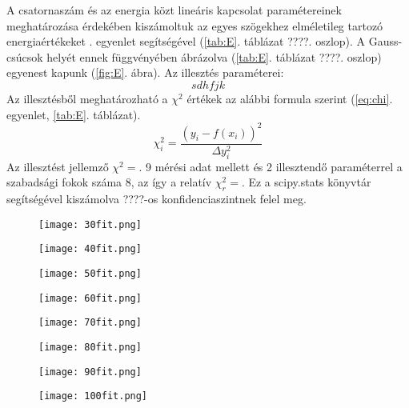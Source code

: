 \documentclass[a4paper,12pt]{article}
\begin{document}
A csatornaszám és az energia közt lineáris kapcsolat paramétereinek meghatározása érdekében kiszámoltuk az egyes szögekhez elméletileg tartozó energiaértékeket . egyenlet segítségével (\ref{tab:E}. táblázat ????. oszlop). A Gauss-csúcsok helyét ennek függvényében ábrázolva (\ref{tab:E}. táblázat ????. oszlop) egyenest kapunk (\ref{fig:E}. ábra). Az illesztés paraméterei:
\begin{equation}
sdhfjk
\end{equation}
Az illesztésből meghatározható a $\chi^2$ értékek az alábbi formula szerint (\ref{eq:chi}. egyenlet, \ref{tab:E}. táblázat).
\begin{equation}
	\chi^2_i=\frac{(y_i-f(x_i))^2}{\Delta y_i^2}
	\label{eq:chi}
\end{equation}
Az illesztést jellemző $\chi^2=$. 9 mérési adat mellett és 2 illesztendő paraméterrel a szabadsági fokok száma 8, az így a relatív $\chi^2_r=$. Ez a scipy.stats könyvtár segítségével kiszámolva ????-os konfidenciaszintnek felel meg.

\begin{figure}[!htb]
    \centering
    \begin{minipage}{.49\textwidth}
        \centering
        \texttt{[image: 30fit.png]}
    \end{minipage}
    \begin{minipage}{.49\textwidth}
        \centering
        \texttt{[image: 40fit.png]}
    \end{minipage}
    \begin{minipage}{.49\textwidth}
        \centering
        \texttt{[image: 50fit.png]}
    \end{minipage}%
    \begin{minipage}{.49\textwidth}
        \centering
        \texttt{[image: 60fit.png]}
    \end{minipage}

    \begin{minipage}{.49\textwidth}
        \centering
        \texttt{[image: 70fit.png]}
    \end{minipage}%
    \begin{minipage}{.49\textwidth}
        \centering
        \texttt{[image: 80fit.png]}
    \end{minipage}

    \begin{minipage}{.49\textwidth}
        \centering
        \texttt{[image: 90fit.png]}
    \end{minipage}
    \begin{minipage}{.49\textwidth}
        \centering
        \texttt{[image: 100fit.png]}
    \end{minipage}
        \end{figure}
\clearpage
\end{document}
